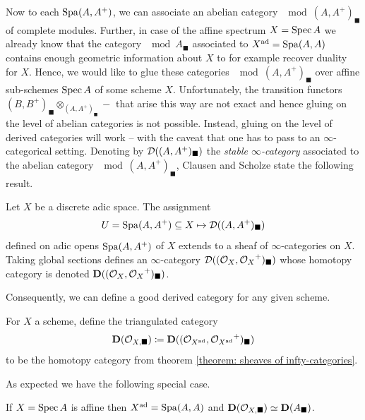 Now to each $\operatorname{Spa}(A, A^+)$, we can associate an abelian category $\mod{(A, A^+)_\blacksquare}$ of complete modules. Further, in case of the affine spectrum $X=\operatorname{Spec} A$ we already know that the category $\mod{A_\blacksquare}$ associated to $X^{\mathrm{ad}} = \operatorname{Spa}(A, A)$ contains enough geometric information about $X$ to for example recover duality for $X$. Hence, we would like to glue these categories $\mod{(A, A^+)_\blacksquare}$ over affine sub-schemes $\operatorname{Spec} A$ of some scheme $X$. Unfortunately, the transition functors $(B, B^+)_\blacksquare\otimes_{(A, A^+)_\blacksquare} -$ that arise this way are not exact and hence gluing on the level of abelian categories is not possible. Instead, gluing on the level of derived categories will work -- with the caveat that one has to pass to an $\infty$-categorical setting. Denoting by ${\mathcal D}((A, A^+)_\blacksquare)$ the \emph{stable $\infty$-category} associated to the abelian category $\mod{(A, A^+)_\blacksquare}$, Clausen and Scholze state the following result. 
\begin{theorem}
	\label{theorem: sheaves of infty-categories}
	
	Let $X$ be a discrete adic space. The assignment 
		$$U=\operatorname{Spa}(A, A^+)\subseteq X \mapsto {\mathcal D}((A, A^+)_\blacksquare)$$
	defined on adic opens $\operatorname{Spa}(A, A^+)$ of $X$ extends to a sheaf of $\infty$-categories on $X$. Taking global sections defines an $\infty$-category ${\mathcal D}(({{\mathcal{O}}_{X}}, {{\mathcal{O}}_{X}}^+)_\blacksquare)$ whose homotopy category is denoted ${{\mathbf{D}}(({{\mathcal{O}}_{X}}, {{\mathcal{O}}_{X}}^+)_\blacksquare)}$. 
\end{theorem}

Consequently, we can define a good derived category for any given scheme.
\begin{definition}
	For $X$ a scheme, define the triangulated category
		$${{\mathbf{D}}({{\mathcal{O}}_{X,\blacksquare}})}\coloneqq {{\mathbf{D}}(({{\mathcal{O}}_{X^{\mathrm{ad}}}}, {{\mathcal{O}}_{X^{\mathrm{ad}}}}^+)_\blacksquare)}$$
	to be the homotopy category from theorem \ref{theorem: sheaves of infty-categories}.
\end{definition}

As expected we have the following special case.
\begin{remark}
	 If $X=\operatorname{Spec} A$ is affine then $X^{\mathrm{ad}}=\operatorname{Spa}(A, A)$ and ${{\mathbf{D}}({{\mathcal{O}}_{X,\blacksquare}})}\simeq {{\mathbf{D}}(A_\blacksquare)}$.
\end{remark}

